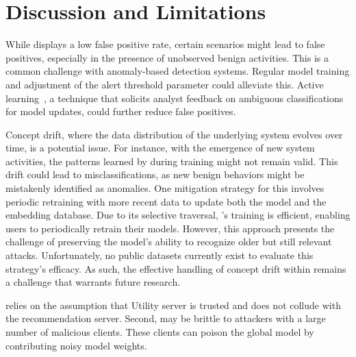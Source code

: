 \section{Discussion and Limitations}
\label{sec:discussion}

 While \Sys displays a low false positive rate, certain scenarios might lead to false positives, especially in the presence of unobserved benign activities. This is a common challenge with anomaly-based detection systems. Regular model training and adjustment of the alert threshold parameter could alleviate this. Active learning~\cite{settles2009active}, a technique that solicits analyst feedback on ambiguous classifications for model updates, could further reduce false positives. 

 Concept drift, where the data distribution of the underlying system evolves over time, is a potential issue. For instance, with the emergence of new system activities, the patterns learned by \Sys during training might not remain valid. This drift could lead to misclassifications, as new benign behaviors might be mistakenly identified as anomalies. One mitigation strategy for this involves periodic retraining with more recent data to update both the model and the embedding database. Due to its selective traversal, \Sys's training is efficient, enabling users to periodically retrain their models. However, this approach presents the challenge of preserving the model's ability to recognize older but still relevant attacks. Unfortunately, no public datasets currently exist to evaluate this strategy's efficacy. As such, the effective handling of concept drift within \Sys remains a challenge that warrants future research.

 \Sys relies on the assumption that Utility server is trusted and does not collude with the recommendation server. Second, \Sys may be brittle to attackers with a large number of malicious clients. These clients can poison the global model by contributing noisy model weights.